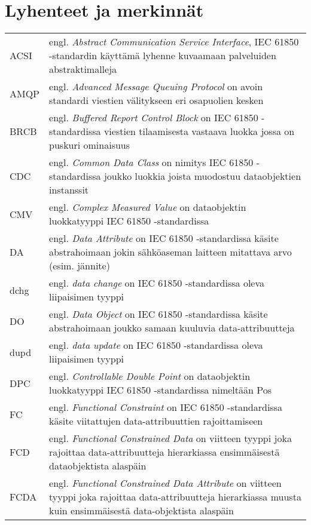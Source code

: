 \chapter*{Lyhenteet ja merkinnät}
\label{ch:lyhenteetjamerkinnat}
\begin{tabularx}{\linewidth}[h]{@{} p{} p{} @{}}
	ACSI & engl. \emph{Abstract Communication Service Interface}, IEC 61850 -standardin käyttämä lyhenne kuvaamaan palveluiden abstraktimalleja \\
	AMQP & engl. \emph{Advanced Message Queuing Protocol} on avoin standardi viestien välitykseen eri osapuolien kesken \\
	BRCB & engl. \emph{Buffered Report Control Block} on IEC 61850 -standardissa viestien tilaamisesta vastaava luokka jossa on puskuri ominaisuus \\
	CDC & engl. \emph{Common Data Class} on nimitys IEC 61850 -standardissa joukko luokkia joista muodostuu dataobjektien instanssit \\
	CMV & engl. \emph{Complex Measured Value} on dataobjektin luokkatyyppi IEC 61850 -standardissa \\
	DA & engl. \emph{Data Attribute} on IEC 61850 -standardissa käsite abstrahoimaan jokin sähköaseman laitteen mitattava arvo (esim. jännite) \\
	dchg & engl. \emph{data change} on IEC 61850 -standardissa oleva liipaisimen tyyppi \\
	DO & engl. \emph{Data Object} on IEC 61850 -standardissa käsite abstrahoimaan joukko samaan kuuluvia data-attribuutteja \\
	dupd & engl. \emph{data update} on IEC 61850 -standardissa oleva liipaisimen tyyppi \\
	DPC & engl. \emph{Controllable Double Point} on dataobjektin luokkatyyppi IEC 61850 -standardissa nimeltään Pos \\
	FC & engl. \emph{Functional Constraint} on IEC 61850 -standardissa käsite viitattujen data-attribuuttien rajoittamiseen \\
	FCD & engl. \emph{Functional Constrained Data} on viitteen tyyppi joka rajoittaa data-attribuutteja hierarkiassa ensimmäisestä dataobjektista alaspäin \\
	FCDA & engl. \emph{Functional Constrained Data Attribute} on viitteen tyyppi joka rajoittaa data-attribuutteja hierarkiassa muusta kuin ensimmäisestä data-objektista alaspäin \\

\end{tabularx}
